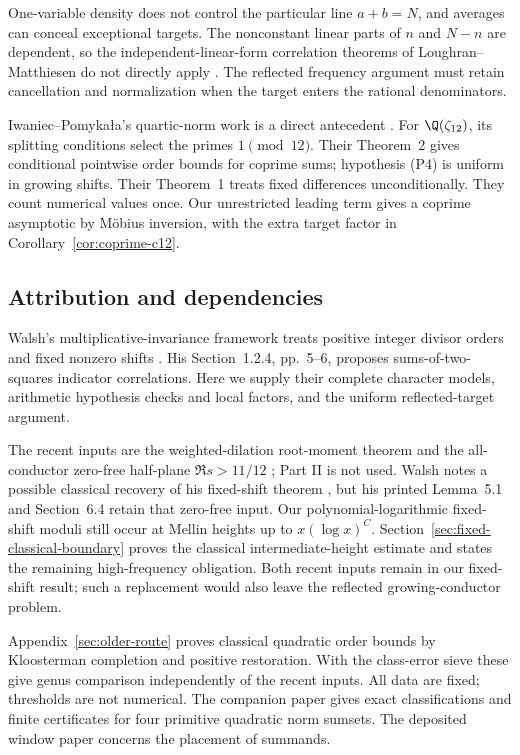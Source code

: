 One-variable density does not control the particular line \(a+b=N\),
and averages can conceal exceptional targets. The nonconstant linear
parts of \(n\) and \(N-n\) are dependent, so the independent-linear-form
correlation theorems of Loughran--Matthiesen do not directly apply
\cite[Theorems 1.9 and 3.10]{loughranmatthiesen}.
The reflected frequency argument must retain cancellation and
normalization when the target enters the rational denominators.

Iwaniec--Pomyka\l a's quartic-norm work is a direct antecedent
\cite{iwaniecpomykala}. For \(\Q(\zeta_{12})\), its splitting conditions
select the primes \(1\pmod{12}\). Their Theorem~2 gives conditional
pointwise order bounds for coprime sums; hypothesis (P4) is uniform
in growing shifts. Their Theorem~1 treats fixed differences
unconditionally. They count numerical values once.
Our unrestricted leading term gives a coprime asymptotic by M\"obius
inversion, with the extra target factor in Corollary~\ref{cor:coprime-c12}.

\subsection{Attribution and dependencies}

Walsh's multiplicative-invariance framework treats positive integer divisor
orders and fixed nonzero shifts \cite{walsh}. His Section~1.2.4, pp.~5--6,
proposes sums-of-two-squares indicator correlations. Here we supply their
complete character models, arithmetic hypothesis checks and local factors,
and the uniform reflected-target argument.

The recent inputs are the weighted-dilation root-moment theorem
\cite[Section 3]{weightedgraphs} and the all-conductor zero-free half-plane
\(\Re s>11/12\) \cite[Part I, Theorem 3.1]{zerofree}; Part II is not used.
Walsh notes a possible classical recovery of his fixed-shift theorem
\cite[p.~2]{walsh}, but his printed Lemma~5.1 and Section~6.4 retain that
zero-free input. Our polynomial-logarithmic fixed-shift moduli still occur
at Mellin heights up to \(x(\log x)^C\).
Section~\ref{sec:fixed-classical-boundary} proves the classical
intermediate-height estimate and states the remaining high-frequency
obligation. Both recent inputs remain in our fixed-shift result; such a
replacement would also leave the reflected growing-conductor problem.

Appendix~\ref{sec:older-route} proves classical quadratic order bounds
by Kloosterman completion and positive restoration. With the class-error
sieve these give genus comparison independently of the recent inputs.
All data are fixed; thresholds are not numerical. The companion paper
\cite{exactcompanion} gives exact classifications and finite certificates
for four primitive quadratic norm sumsets. The deposited window paper
concerns the placement of summands.

